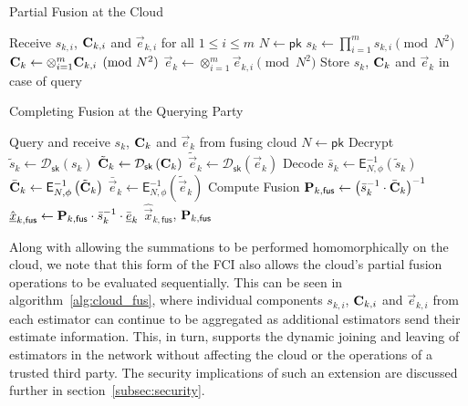 \begin{algorithm}[htbp]
\caption{Partial Fusion at the Cloud}\label{alg:cloud_fusion:secfci2_cloud_steps}
\begin{algorithmic}[1]
    \State Receive $s_{k,i}$, ${{\mathbf{C}}}_{k,i}$ and $\vec{e}_{k,i}$ for all $1\leq i \leq m$
    \State $N \gets \mathsf{pk}$
    \State $s_k \gets \prod_{i=1}^{m} s_{k,i} \pmod{N^2}$
    \State ${{\mathbf{C}}}_k \gets \otimes_{i=1}^{m} {{\mathbf{C}}}_{k,i} \pmod{N^2}$
    \State $\vec{e}_k \gets \otimes_{i=1}^{m} \vec{e}_{k,i} \pmod{N^2}$
    \State Store $s_k$, ${{\mathbf{C}}}_k$ and $\vec{e}_k$ in case of query
    \EndProcedure
\end{algorithmic}
\end{algorithm}
\begin{algorithm}[htbp]
\caption{Completing Fusion at the Querying Party}\label{alg:cloud_fusion:secfci2_query_steps}
\begin{algorithmic}[1]
    \State Query and receive $s_k$, ${{\mathbf{C}}}_k$ and $\vec{e}_k$ from fusing cloud
    \State $N \gets \mathsf{pk}$
    \LineComment Decrypt
    \State $\tilde{s}_k \gets \mathcal{D}_{\mathsf{sk}}\left(s_k\right)$
    \State $\tilde{{{\mathbf{C}}}}_k \gets \mathcal{D}_{\mathsf{sk}}\left({{\mathbf{C}}}_k\right)$
    \State $\tilde{\vec{e}}_k \gets \mathcal{D}_{\mathsf{sk}}\left(\vec{e}_k\right)$
    \LineComment Decode
    \State $\bar{s}_k \gets \mathsf{E}^{-1}_{N,\phi}\left(\tilde{s}_k\right)$
    \State $\bar{{{\mathbf{C}}}}_k \gets \mathsf{E}^{-1}_{N,\phi}\left(\tilde{{{\mathbf{C}}}}_k\right)$
    \State $\bar{\vec{e}}_k \gets \mathsf{E}^{-1}_{N,\phi}\left(\tilde{\vec{e}}_k\right)$
    \LineComment Compute Fusion
    \State ${{\mathbf{P}}}_{k,\mathsf{fus}} \gets \left(\bar{s}_k^{-1} \cdot \bar{{{\mathbf{C}}}}_k\right)^{-1}$
    \State $\hat{{\underline{x}}}_{k,\mathsf{fus}} \gets {\ensuremath{{\mathbf{P}}}}_{k,\mathsf{fus}} \cdot \bar{s}_k^{-1} \cdot \bar{{\underline{e}}}_k$
    \State \Return $\hat{\vec{x}}_{k,\mathsf{fus}}$, ${{\mathbf{P}}}_{k,\mathsf{fus}}$
    \EndProcedure
\end{algorithmic}
\end{algorithm}

\begin{remark}\label{rem:seq_extension}
    Along with allowing the summations to be performed homomorphically on the cloud, we note that this form of the FCI also allows the cloud's partial fusion operations to be evaluated sequentially. This can be seen in algorithm~\ref{alg:cloud_fus}, where individual components $s_{k,i}$, ${{\mathbf{C}}}_{k,i}$ and $\vec{e}_{k,i}$ from each estimator can continue to be aggregated as additional estimators send their estimate information. This, in turn, supports the dynamic joining and leaving of estimators in the network without affecting the cloud or the operations of a trusted third party. The security implications of such an extension are discussed further in section~\ref{subsec:security}.
\end{remark}

